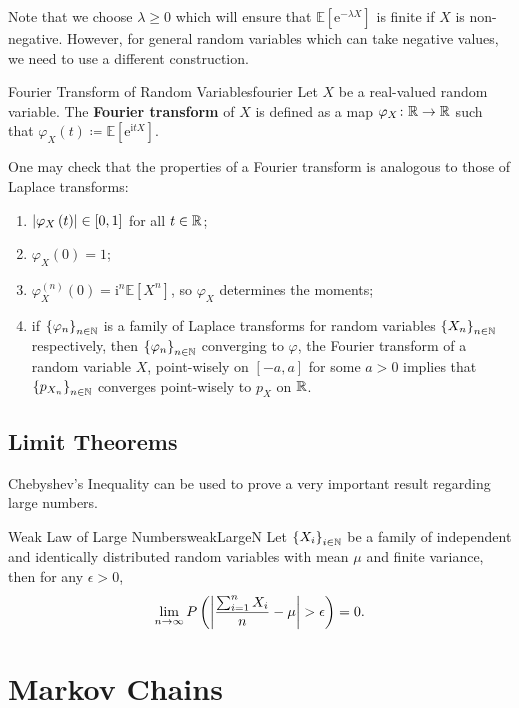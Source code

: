 \documentclass[math, code]{amznotes}
\theoremstyle{remark}
\newcommand{\e}{\mathrm{e}}
\newcommand{\im}{\mathrm{i}}
\begin{document}
Note that we choose $\lambda \geq 0$ which will ensure that $\mathbb{E}\left[\e^{-\lambda X}\right]$ is finite if $X$ is non-negative. However, for general random variables which can take negative values, we need to use a different construction.
\begin{dfnbox}{Fourier Transform of Random Variables}{fourier}
    Let $X$ be a real-valued random variable. The {\color{red} \textbf{Fourier transform}} of $X$ is defined as a map $\varphi_X \colon \mathbb{R} \to \mathbb{R}$ such that $\varphi_X\left(t\right) \coloneqq \mathbb{E}\left[\e^{\im tX}\right]$.
\end{dfnbox}
One may check that the properties of a Fourier transform is analogous to those of Laplace transforms:
\begin{enumerate}
    \item ${\left\lvert {\varphi_X\left(t\right)} \right\rvert} \in \left[0, 1\right]$ for all $t \in \mathbb{R}$;
    \item $\varphi_X\left(0\right) = 1$;
    \item $\varphi^{(n)}_X\left(0\right) = \im^n\mathbb{E}\left[X^n\right]$, so $\varphi_X$ determines the moments;
    \item if $\left\{\varphi_n\right\}_{n \in \mathbb{N}}$ is a family of Laplace transforms for random variables $\left\{X_n\right\}_{n \in \mathbb{N}}$ respectively, then $\left\{\varphi_n\right\}_{n \in \mathbb{N}}$ converging to $\varphi$, the Fourier transform of a random variable $X$, point-wisely on $\left[-a, a\right]$ for some $a > 0$ implies that $\left\{p_{X_n}\right\}_{n \in \mathbb{N}}$ converges point-wisely to $p_X$ on $\mathbb{R}$.
\end{enumerate}
\section{Limit Theorems}
Chebyshev's Inequality can be used to prove a very important result regarding large numbers.
\begin{thmbox}{Weak Law of Large Numbers}{weakLargeN}
    Let $\left\{X_i\right\}_{i \in \mathbb{N}}$ be a family of independent and identically distributed random variables with mean $\mu$ and finite variance, then for any $\epsilon > 0$, 
    \begin{equation*}
        \lim_{n \to \infty}P\left({\left\lvert {\frac{\sum_{i = 1}^{n}X_i}{n} - \mu} \right\rvert} > \epsilon\right) = 0.
    \end{equation*}
\end{thmbox}
\chapter{Markov Chains}
\end{document}
